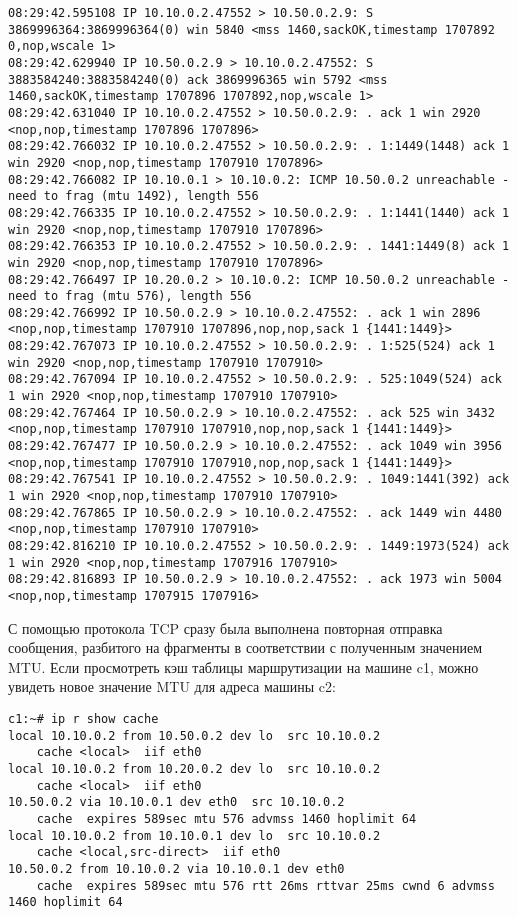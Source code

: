 \documentclass[a4paper,12pt]{article}
\begin{document}
\begin{Verbatim}
08:29:42.595108 IP 10.10.0.2.47552 > 10.50.0.2.9: S 3869996364:3869996364(0) win 5840 <mss 1460,sackOK,timestamp 1707892 0,nop,wscale 1>
08:29:42.629940 IP 10.50.0.2.9 > 10.10.0.2.47552: S 3883584240:3883584240(0) ack 3869996365 win 5792 <mss 1460,sackOK,timestamp 1707896 1707892,nop,wscale 1>
08:29:42.631040 IP 10.10.0.2.47552 > 10.50.0.2.9: . ack 1 win 2920 <nop,nop,timestamp 1707896 1707896>
08:29:42.766032 IP 10.10.0.2.47552 > 10.50.0.2.9: . 1:1449(1448) ack 1 win 2920 <nop,nop,timestamp 1707910 1707896>
08:29:42.766082 IP 10.10.0.1 > 10.10.0.2: ICMP 10.50.0.2 unreachable - need to frag (mtu 1492), length 556
08:29:42.766335 IP 10.10.0.2.47552 > 10.50.0.2.9: . 1:1441(1440) ack 1 win 2920 <nop,nop,timestamp 1707910 1707896>
08:29:42.766353 IP 10.10.0.2.47552 > 10.50.0.2.9: . 1441:1449(8) ack 1 win 2920 <nop,nop,timestamp 1707910 1707896>
08:29:42.766497 IP 10.20.0.2 > 10.10.0.2: ICMP 10.50.0.2 unreachable - need to frag (mtu 576), length 556
08:29:42.766992 IP 10.50.0.2.9 > 10.10.0.2.47552: . ack 1 win 2896 <nop,nop,timestamp 1707910 1707896,nop,nop,sack 1 {1441:1449}>
08:29:42.767073 IP 10.10.0.2.47552 > 10.50.0.2.9: . 1:525(524) ack 1 win 2920 <nop,nop,timestamp 1707910 1707910>
08:29:42.767094 IP 10.10.0.2.47552 > 10.50.0.2.9: . 525:1049(524) ack 1 win 2920 <nop,nop,timestamp 1707910 1707910>
08:29:42.767464 IP 10.50.0.2.9 > 10.10.0.2.47552: . ack 525 win 3432 <nop,nop,timestamp 1707910 1707910,nop,nop,sack 1 {1441:1449}>
08:29:42.767477 IP 10.50.0.2.9 > 10.10.0.2.47552: . ack 1049 win 3956 <nop,nop,timestamp 1707910 1707910,nop,nop,sack 1 {1441:1449}>
08:29:42.767541 IP 10.10.0.2.47552 > 10.50.0.2.9: . 1049:1441(392) ack 1 win 2920 <nop,nop,timestamp 1707910 1707910>
08:29:42.767865 IP 10.50.0.2.9 > 10.10.0.2.47552: . ack 1449 win 4480 <nop,nop,timestamp 1707910 1707910>
08:29:42.816210 IP 10.10.0.2.47552 > 10.50.0.2.9: . 1449:1973(524) ack 1 win 2920 <nop,nop,timestamp 1707916 1707910>
08:29:42.816893 IP 10.50.0.2.9 > 10.10.0.2.47552: . ack 1973 win 5004 <nop,nop,timestamp 1707915 1707916>
\end{Verbatim}

С помощью протокола TCP сразу была выполнена повторная отправка сообщения, разбитого на фрагменты в соответствии с полученным значением MTU.
Если просмотреть кэш таблицы маршрутизации на машине c1, можно увидеть новое значение MTU для адреса машины c2:

\begin{Verbatim}
c1:~# ip r show cache
local 10.10.0.2 from 10.50.0.2 dev lo  src 10.10.0.2 
    cache <local>  iif eth0
local 10.10.0.2 from 10.20.0.2 dev lo  src 10.10.0.2 
    cache <local>  iif eth0
10.50.0.2 via 10.10.0.1 dev eth0  src 10.10.0.2 
    cache  expires 589sec mtu 576 advmss 1460 hoplimit 64
local 10.10.0.2 from 10.10.0.1 dev lo  src 10.10.0.2 
    cache <local,src-direct>  iif eth0
10.50.0.2 from 10.10.0.2 via 10.10.0.1 dev eth0 
    cache  expires 589sec mtu 576 rtt 26ms rttvar 25ms cwnd 6 advmss 1460 hoplimit 64
\end{Verbatim}
\end{document}
